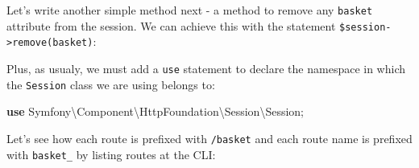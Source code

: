 \documentclass[a4paperpaper,openright]{book}
\newenvironment{Shaded}{}{}
\newcommand{\AnnotationTok}[1]{\textcolor[rgb]{0.38,0.63,0.69}{\textbf{\textit{#1}}}}
\newcommand{\CommentTok}[1]{\textcolor[rgb]{0.38,0.63,0.69}{\textit{#1}}}
\newcommand{\KeywordTok}[1]{\textcolor[rgb]{0.00,0.44,0.13}{\textbf{#1}}}
\newcommand{\NormalTok}[1]{#1}
\newcommand{\OtherTok}[1]{\textcolor[rgb]{0.00,0.44,0.13}{#1}}
\newcommand{\StringTok}[1]{\textcolor[rgb]{0.25,0.44,0.63}{#1}}
\begin{document}
Let's write another simple method next - a method to remove any
\texttt{basket} attribute from the session. We can achieve this with the
statement
\texttt{\$session-\textgreater{}remove(\textquotesingle{}basket\textquotesingle{})}:

\begin{Shaded}
\end{Shaded}

Plus, as usualy, we must add a \texttt{use} statement to declare the
namespace in which the \texttt{Session} class we are using belongs to:

\begin{Shaded}
\begin{Highlighting}[]
    \KeywordTok{use}\NormalTok{ Symfony\textbackslash{}Component\textbackslash{}HttpFoundation\textbackslash{}Session\textbackslash{}Session}\OtherTok{;}
\end{Highlighting}
\end{Shaded}

Let's see how each route is prefixed with \texttt{/basket} and each
route name is prefixed with \texttt{basket\_} by listing routes at the
CLI:
\end{document}
